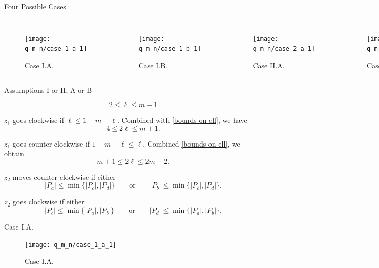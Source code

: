 \begin{frame}{Four Possible Cases}
\begin{columns}[onlytextwidth, T]
\begin{figure}
  \texttt{[image: q\_m\_n/case\_1\_a\_1]}
  \caption{Case I.A.}
\end{figure}
\begin{figure}
  \texttt{[image: q\_m\_n/case\_1\_b\_1]}
  \caption{Case I.B.}
\end{figure}
\begin{figure}
  \texttt{[image: q\_m\_n/case\_2\_a\_1]}
  \caption{Case II.A.}
\end{figure}
\begin{figure}
  \texttt{[image: q\_m\_n/case\_2\_b\_1]}
  \caption{Case II.B.}
\end{figure}
\end{columns}
\end{frame}


\begin{frame}{Assumptions I or II, A or B}

\[ 2 \leq \ell \leq m-1 \tag{*} \label{bounds on ell} \]

$z_1$ goes clockwise if $\ell \leq 1 + m - \ell$. Combined with \ref{bounds on ell}, we have
\[ 4 \leq 2 \ell \leq m + 1 \tag{A} \label{assumption a} . \]

$z_1$ goes counter-clockwise if $1 + m - \ell \leq \ell$. Combined \ref{bounds on ell}, we obtain
\[ m + 1 \leq 2 \ell \leq 2m - 2 \tag{B} \label{assumption b} . \]

$z_2$ moves counter-clockwise if either
\[ |P_a| \leq \min \{ |P_c|, |P_d| \}\qquad \text{or} \qquad |P_b| \leq \min \{ |P_c|, |P_d| \} \tag{I} \label{assumption i} . \]

$z_2$ goes clockwise if either
\[ |P_c| \leq \min \{ |P_a|, |P_b| \}\qquad \text{or} \qquad |P_d| \leq \min \{ |P_a|, |P_b| \} \tag{II} \label{assumption ii}. \]
\end{frame}

\begin{frame}{Case I.A.}
\begin{figure}
\texttt{[image: q\_m\_n/case\_1\_a\_1]}
\caption{Case I.A.}
\end{figure}
\end{frame}

